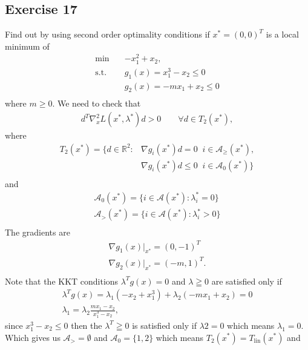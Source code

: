 \subsection{Exercise 17}
Find out by using second order optimality conditions if $x^{*} = (0, 0)^{T}$
is a local minimum of
\begin{align}
    \text{min}\quad & -x_1^{2} + x_2,\\
    \text{s.t.}\quad & g_1\left(x  \right) = x_1^{3} - x_2 \le 0 \nonumber\\
    &g_2(x) = -mx_1+x_2 \le 0 \nonumber\\
\end{align}
where $m\ge0$.
We need to check that
\begin{align}
    d^{T}\nabla^{2}_x L(x^{*}, \lambda^{*})d >0 \qquad \forall d \in
    T_2(x^{*}),
\end{align}
    where
\begin{align}
    T_2(x^{*}) = \{d\in \mathbb{R}^{2}: &\nabla g_i(x^{*})d =0\;\; i \in
    \mathcal{A}_\ge (x^{*}), \\
    &\nabla g_i(x^{*})d \le 0\;\; i \in
    \mathcal{A}_0 (x^{*}) \}\\
\end{align}
and
\begin{align}
    \mathcal{A}_0(x^{*}) = \{i \in \mathcal{A}(x^{*}): \lambda_i^{*} = 0\} \\
    \mathcal{A}_>(x^{*}) = \{i \in \mathcal{A}(x^{*}): \lambda_i^{*} > 0\} \\
\end{align}
The gradients are
\begin{align}
    \nabla g_1 (x)|_{x^{*}} = (0, -1)^{T}\\
    \nabla g_2 (x)|_{x^{*}} = (-m, 1)^{T}.\\
\end{align}
Note that the KKT conditions $\lambda^{T}g(x)=0$ and $\lambda \geqq 0$ are
satisfied only if
\begin{align}
    \lambda^{T}g(x) = \lambda_1(-x_2 + x_1^{3}) + \lambda_2(-mx_1 + x_2) =
    0\\
    \lambda_1 = \lambda_2 \frac{mx_1 - x_2}{x_1^{3} -x_2},
\end{align}
since $x_1^{3} - x_2 \le 0$ then the $\lambda^{T} \geqq 0$ is satisfied only
if $\lambda 2 = 0$ which means $\lambda_1 =0$. Which gives us
$\mathcal{A}_> = \emptyset$ and $\mathcal{A}_0 = \{1, 2\}$ which means
$T_2(x^{*}) = T_\text{lin}(x^{*})$ and
